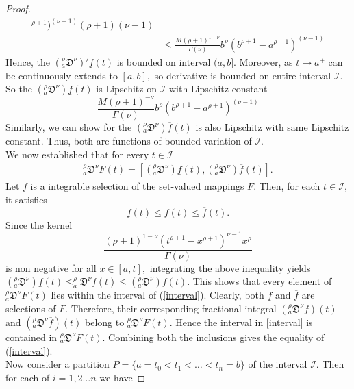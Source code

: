 \documentclass[10pt,a4paper]{amsart}
\begin{document}
\begin{proof}
\begin{equation*}
\begin{aligned}
{        ^{\rho+1})^{(\nu-1)}}{(\rho+1)(\nu-1)}\\
        &\le \frac{M(\rho+1)^{1-\nu}}{\Gamma(\nu)} b^\rho (b^{\rho+1}-a
        ^{\rho+1})^{(\nu-1)}
    \end{aligned}
\end{equation*}
Hence, the $(_a^\rho\mathfrak{D}^\nu)' \underline{f}(t)$ is bounded on interval $(a,b].$ Moreover, as $ t \to a ^+$ can be continuously extends to $[a,b],$ so derivative is bounded on entire interval $\mathcal{I}.$ So the $(_a^\rho\mathfrak{D}^\nu)\underline{f}(t)$ is Lipschitz on $\mathcal{I}$ with Lipschitz constant 
\[ \frac{M(\rho+1)^{-\nu}}{\Gamma(\nu)} b^\rho (b^{\rho+1}-a
        ^{\rho+1})^{(\nu-1)} \]
        Similarly, we can show for the $(_a^\rho\mathfrak{D}^\nu) \overline{f}(t)$ is also Lipschitz with same Lipschitz constant. Thus, both are functions of bounded variation of $\mathcal{I}.$\\
        We now established that for every $t\in \mathcal{I}$
    \begin{equation} \label{interval}
        \begin{aligned}  
     _a^\rho\mathfrak{D}^\nu F(t)=[(_a^\rho\mathfrak{D}^\nu) \underline{f}(t),(_a^\rho\mathfrak{D}^\nu)\overline{f}(t) ]. 
       \end{aligned}
    \end{equation}  
        Let $f$ is a integrable selection of the set-valued mappings $F.$ Then, for each $t\in \mathcal{I},$ it satisfies 
        \[ \underline{f}(t)\le f(t) \le \overline{f}(t).\] 
        Since the kernel \[\frac{(\rho+1)^{1-\nu}(t^{\rho+1}-x^{\rho+1})^{\nu-1}x^{\rho}}{\Gamma(\nu)}\] is non negative for all $x\in [a,t],$ integrating the above inequality yields $ (_a^\rho\mathfrak{D}^\nu) \underline{f}(t) \le _a^\rho\mathfrak{D}^\nu f(t)\le  (_a^\rho\mathfrak{D}^\nu) \overline{f}(t).$ 
        This shows that every element of $ _a^\rho\mathfrak{D}^\nu F(t) $ lies within the  interval of (\ref{interval}). Clearly, both $\underline{f}$ and $\overline{f}$ are selections of $F.$ Therefore, their corresponding fractional integral $(_a^\rho\mathfrak{D}^\nu \underline{f})(t)$ and $(_a^\rho\mathfrak{D}^\nu \overline{f})(t)$ belong to $_a^\rho\mathfrak{D}^\nu F(t).$ Hence the interval in \ref{interval} is contained in $_a^\rho\mathfrak{D}^\nu F(t).$ Combining both the inclusions gives the equality of (\ref{interval}).\\
      Now consider a partition $P=\{a=t_0<t_1<\ldots <t_n=b \}$ of the interval $\mathcal{I}.$ Then for each of $i=1,2\ldots n$ we have 

\end{proof}
\end{document}
